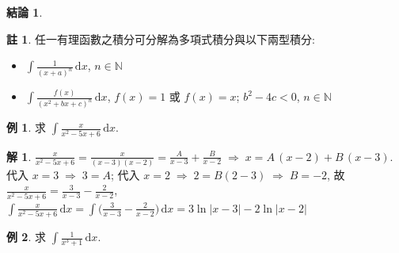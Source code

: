 \documentclass[12pt]{extarticle}
\newcommand{\ds}{\displaystyle}
\newcommand{\ie}{\;\Longrightarrow\;}
\DeclareMathOperator*{\degr}{deg}
\theoremstyle{definition}
\newtheorem*{fact}{結論}
\newtheorem*{ex}{例}
\newtheorem*{sol}{解}
\newtheorem*{rmk}{註}
\begin{document}
\begin{fact}
\begin{itemize}
  \end{itemize}
\end{fact}

\begin{rmk} 任一有理函數之積分可分解為多項式積分與以下兩型積分: 
  \setlength{\columnsep}{-5cm}
  \begin{multicols}{2}
    \begin{itemize}\setlength{\itemsep}{0pt}
      \item $\ds\int\!\frac{1}{(x + a)^n}\,\text{d}x$, $n\in\mathbb{N}$
      \item $\ds\int\!\frac{f(x)}{(x^2 + b x + c)^n}\,\text{d}x$, $f(x) = 1$ 或 $f(x) = x$; $b^2 - 4 c < 0$, $n\in\mathbb{N}$
    \end{itemize}
  \end{multicols}
\end{rmk}

\begin{ex}
  求 $\ds\int\!\frac{x}{x^2 - 5x + 6}\,\text{d}x$. 
\end{ex}

\begin{sol}
  $\ds\frac{x}{x^2 - 5x + 6} = \frac{x}{(x - 3)(x - 2)} = \frac{A}{x - 3} + \frac{B}{x - 2} \ie x = A\,(x - 2) + B\,(x - 3)$. 代入 $x = 3\ie 3 = A$; 代入 $x = 2\ie 2 = B(2 - 3) \ie B = -2$, 故 $\ds\frac{x}{x^2 - 5x + 6} = \frac{3}{x - 3} - \frac{2}{x - 2}$, $\ds\int\!\frac{x}{x^2 - 5x + 6}\,\text{d}x = \int\bigg(\frac{3}{x - 3} - \frac{2}{x - 2}\bigg)\,\text{d}x = 3\ln|x - 3| - 2\ln|x - 2|$
\end{sol}

\begin{ex}
  求 $\ds\int\!\frac{1}{x^3 + 1}\,\text{d}x$. 
\end{ex}
\end{document}
